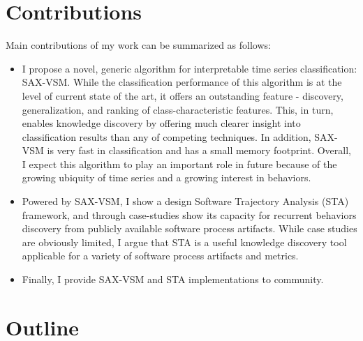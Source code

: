 \section{Contributions}\label{section_contributions}
Main contributions of my work can be summarized as follows: 
\begin{itemize}
\item I propose a novel, generic algorithm for interpretable time series classification: SAX-VSM. 
While the classification performance of this algorithm is at the level of current state of the art, 
it offers an outstanding feature - discovery, generalization, and ranking of class-characteristic features. 
This, in turn, enables knowledge discovery by offering much clearer insight into classification results than any of 
competing techniques.
In addition, SAX-VSM is very fast in classification and has a small memory footprint. 
Overall, I expect this algorithm to play an important role in future because of the growing ubiquity of time series and 
a growing interest in behaviors.
\item Powered by SAX-VSM, I show a design Software Trajectory Analysis (STA) framework, 
and through case-studies show its capacity for recurrent behaviors discovery from publicly available software process
artifacts. While case studies are 
obviously limited, I argue that STA is a useful knowledge discovery tool applicable for a variety of software process 
artifacts and metrics. 
\item Finally, I provide SAX-VSM and STA implementations to community.
\end{itemize}

\section{Outline}\label{section_organization}
